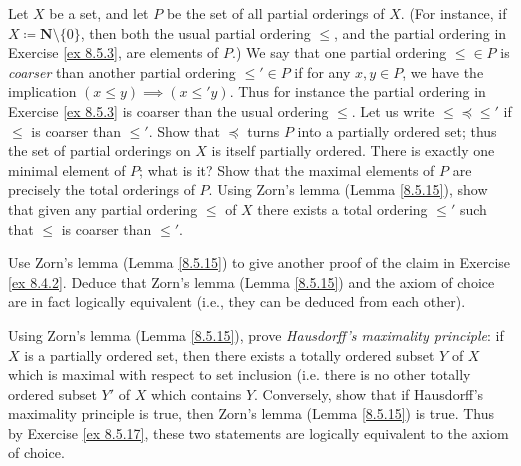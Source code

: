 \begin{exercise}\label{ex 8.5.16}
    Let \(X\) be a set, and let \(P\) be the set of all partial orderings of \(X\).
    (For instance, if \(X \coloneqq \mathbf{N} \setminus \{0\}\), then both the usual partial ordering \(\leq\), and the partial ordering in Exercise \ref{ex 8.5.3}, are elements of \(P\).)
    We say that one partial ordering \(\leq \in P\) is \emph{coarser} than another partial ordering \(\leq' \in P\) if for any \(x, y \in P\), we have the implication \((x \leq y) \implies (x \leq' y)\).
    Thus for instance the partial ordering in Exercise \ref{ex 8.5.3} is coarser than the usual ordering \(\leq\).
    Let us write \(\leq \preceq \leq'\) if \(\leq\) is coarser than \(\leq'\).
    Show that \(\preceq\) turns \(P\) into a partially ordered set;
    thus the set of partial orderings on \(X\) is itself partially ordered.
    There is exactly one minimal element of \(P\);
    what is it?
    Show that the maximal elements of \(P\) are precisely the total orderings of \(P\).
    Using Zorn's lemma (Lemma \ref{8.5.15}), show that given any partial ordering \(\leq\) of \(X\) there exists a total ordering \(\leq'\) such that \(\leq\) is coarser than \(\leq'\).
\end{exercise}

\begin{exercise}\label{ex 8.5.17}
    Use Zorn's lemma (Lemma \ref{8.5.15}) to give another proof of the claim in Exercise \ref{ex 8.4.2}.
    Deduce that Zorn's lemma (Lemma \ref{8.5.15}) and the axiom of choice are in fact logically equivalent
    (i.e., they can be deduced from each other).
\end{exercise}

\begin{exercise}\label{ex 8.5.18}
    Using Zorn's lemma (Lemma \ref{8.5.15}), prove \emph{Hausdorff's maximality principle}:
    if \(X\) is a partially ordered set, then there exists a totally ordered subset \(Y\) of \(X\) which is maximal with respect to set inclusion
    (i.e. there is no other totally ordered subset \(Y'\) of \(X\) which contains \(Y\).
    Conversely, show that if Hausdorff's maximality principle is true, then Zorn's lemma (Lemma \ref{8.5.15}) is true.
    Thus by Exercise \ref{ex 8.5.17}, these two statements are logically equivalent to the axiom of choice.
\end{exercise}

